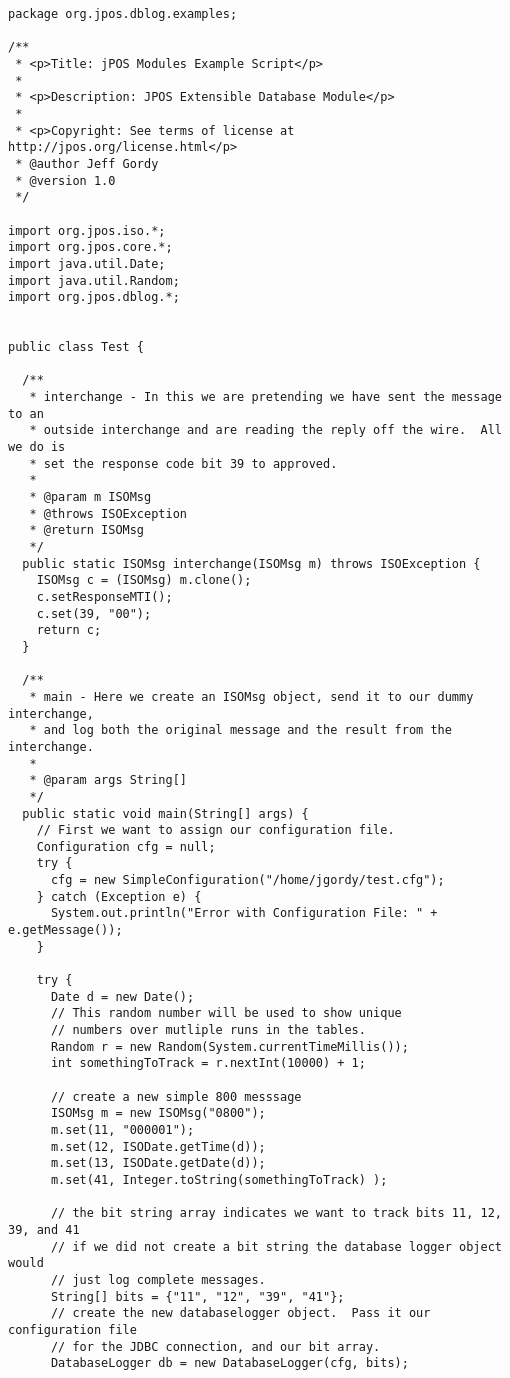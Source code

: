 \documentclass[11pt]{report}
\begin{document}
\begin{flushleft}
\begin{verbatim}
package org.jpos.dblog.examples;

/**
 * <p>Title: jPOS Modules Example Script</p>
 *
 * <p>Description: JPOS Extensible Database Module</p>
 *
 * <p>Copyright: See terms of license at http://jpos.org/license.html</p>
 * @author Jeff Gordy
 * @version 1.0
 */

import org.jpos.iso.*;
import org.jpos.core.*;
import java.util.Date;
import java.util.Random;
import org.jpos.dblog.*;


public class Test {

  /**
   * interchange - In this we are pretending we have sent the message to an
   * outside interchange and are reading the reply off the wire.  All we do is
   * set the response code bit 39 to approved.
   *
   * @param m ISOMsg
   * @throws ISOException
   * @return ISOMsg
   */
  public static ISOMsg interchange(ISOMsg m) throws ISOException {
    ISOMsg c = (ISOMsg) m.clone();
    c.setResponseMTI();
    c.set(39, "00");
    return c;
  }

  /**
   * main - Here we create an ISOMsg object, send it to our dummy interchange,
   * and log both the original message and the result from the interchange.
   *
   * @param args String[]
   */
  public static void main(String[] args) {
    // First we want to assign our configuration file.
    Configuration cfg = null;
    try {
      cfg = new SimpleConfiguration("/home/jgordy/test.cfg");
    } catch (Exception e) {
      System.out.println("Error with Configuration File: " + e.getMessage());
    }

    try {
      Date d = new Date();
      // This random number will be used to show unique 
      // numbers over mutliple runs in the tables.
      Random r = new Random(System.currentTimeMillis());
      int somethingToTrack = r.nextInt(10000) + 1;

      // create a new simple 800 messsage
      ISOMsg m = new ISOMsg("0800");
      m.set(11, "000001");
      m.set(12, ISODate.getTime(d));
      m.set(13, ISODate.getDate(d));
      m.set(41, Integer.toString(somethingToTrack) );

      // the bit string array indicates we want to track bits 11, 12, 39, and 41
      // if we did not create a bit string the database logger object would 
      // just log complete messages.
      String[] bits = {"11", "12", "39", "41"};
      // create the new databaselogger object.  Pass it our configuration file
      // for the JDBC connection, and our bit array.
      DatabaseLogger db = new DatabaseLogger(cfg, bits);


\end{verbatim}
\end{flushleft}
\end{document}
